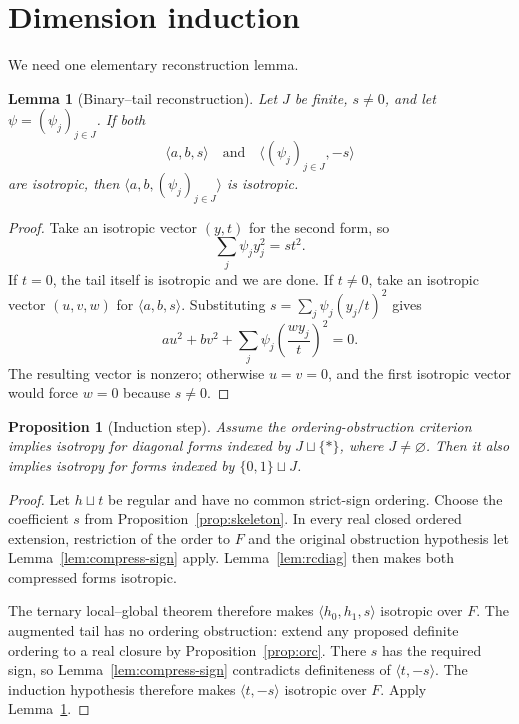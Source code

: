 \documentclass[uplatex,dvipdfmx]{jsarticle}
\newtheorem{proposition}[theorem]{Proposition}
\newtheorem{lemma}[theorem]{Lemma}
\theoremstyle{definition}
\theoremstyle{remark}
\begin{document}
\section{Dimension induction}

We need one elementary reconstruction lemma.

\begin{lemma}[Binary--tail reconstruction]\label{lem:reconstruct}
Let $J$ be finite, $s\ne0$, and let $\psi=(\psi_j)_{j\in J}$.  If both
\[
  \langle a,b,s\rangle
  \quad\text{and}\quad
  \langle (\psi_j)_{j\in J},-s\rangle
\]
are isotropic, then $\langle a,b,(\psi_j)_{j\in J}\rangle$ is isotropic.
\end{lemma}
\begin{proof}
Take an isotropic vector $(y,t)$ for the second form, so
\[
  \sum_j\psi_jy_j^2=s t^2.
\]
If $t=0$, the tail itself is isotropic and we are done.  If $t\ne0$, take
an isotropic vector $(u,v,w)$ for $\langle a,b,s\rangle$.  Substituting
$s=\sum_j\psi_j(y_j/t)^2$ gives
\[
  au^2+bv^2+\sum_j\psi_j\left(\frac{w y_j}{t}\right)^2=0.
\]
The resulting vector is nonzero; otherwise $u=v=0$, and the first isotropic
vector would force $w=0$ because $s\ne0$.
\end{proof}

\begin{proposition}[Induction step]\label{prop:step}
Assume the ordering-obstruction criterion implies isotropy for diagonal forms
indexed by $J\sqcup\{*\}$, where $J\ne\varnothing$.  Then it also implies
isotropy for forms indexed by $\{0,1\}\sqcup J$.
\end{proposition}
\begin{proof}
Let $h\sqcup t$ be regular and have no common strict-sign ordering.  Choose
the coefficient $s$ from Proposition~\ref{prop:skeleton}.  In every real
closed ordered extension, restriction of the order to $F$ and the original
obstruction hypothesis let Lemma~\ref{lem:compress-sign} apply.
Lemma~\ref{lem:rcdiag} then makes both compressed forms isotropic.

The ternary local--global theorem therefore makes
$\langle h_0,h_1,s\rangle$ isotropic over $F$.  The augmented tail has no
ordering obstruction: extend any proposed definite ordering to a real closure
by Proposition~\ref{prop:orc}.  There $s$ has the required sign, so
Lemma~\ref{lem:compress-sign} contradicts definiteness of $\langle t,-s\rangle$.
The induction hypothesis therefore makes
$\langle t,-s\rangle$ isotropic over $F$.  Apply
Lemma~\ref{lem:reconstruct}.
\end{proof}
\end{document}
